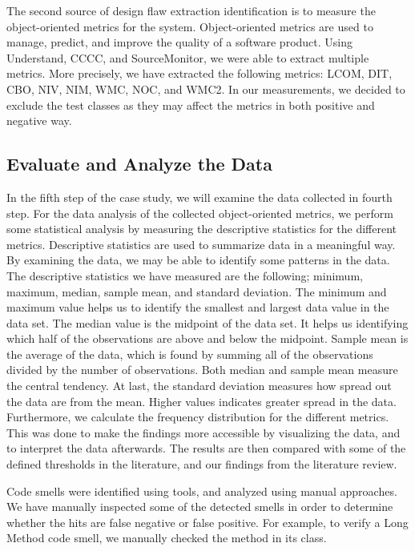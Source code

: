 The second source of design flaw extraction identification is to measure the object-oriented metrics for the system. Object-oriented metrics are used to manage, predict, and improve the quality of a software product\cite{rodriguez2001overview}. Using Understand, CCCC, and SourceMonitor, we were able to extract multiple metrics. More precisely, we have extracted the following metrics: LCOM, DIT, CBO, NIV, NIM, WMC, NOC, and WMC2. In our measurements, we decided to exclude the test classes as they may affect the metrics in both positive and negative way.




\subsection{Evaluate and Analyze the Data}
In the fifth step of the case study, we will examine the data collected in fourth step. For the data analysis of the collected object-oriented metrics, we perform some statistical analysis by measuring the descriptive statistics for the different metrics. Descriptive statistics are used to summarize data in a meaningful way. By examining the data, we may be able to identify some patterns in the data. The descriptive statistics we have measured are the following; minimum, maximum, median, sample mean, and standard deviation. The minimum and maximum value helps us to identify the smallest and largest data value in the data set. The median value is the midpoint of the data set. It helps us identifying which half of the observations are above and below the midpoint. Sample mean is the average of the data, which is found by summing all of the observations divided by the number of observations. Both median and sample mean measure the central tendency. At last, the standard deviation measures how spread out the data are from the mean. Higher values indicates greater spread in the data. Furthermore, we calculate the frequency distribution for the different metrics. This was done to make the findings more accessible by visualizing the data, and to interpret the data afterwards. The results are then compared with some of the defined thresholds in the literature, and our findings from the literature review. 

Code smells were identified using tools, and analyzed using manual approaches. We have manually inspected some of the detected smells in order to determine whether the hits are false negative or false positive. For example, to verify a Long Method code smell, we manually checked the method in its class. 



